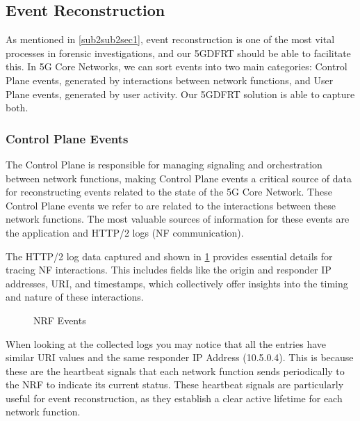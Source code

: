\documentclass[final,1p,times,authoryear]{elsarticle}
\begin{document}
\subsection{Event Reconstruction}
\label{sub4sec2}
As mentioned in \ref{sub2sub2sec1}, event reconstruction is one of the most vital processes in forensic investigations, and our 5GDFRT should be able to facilitate this. In 5G Core Networks, we can sort events into two main categories: Control Plane events, generated by interactions between network functions, and User Plane events, generated by user activity. Our 5GDFRT solution is able to capture both.

\subsubsection{Control Plane Events}
\label{sub4sub2sec1}
The Control Plane is responsible for managing signaling and orchestration between network functions, making Control Plane events a critical source of data for reconstructing events related to the state of the 5G Core Network. These Control Plane events we refer to are related to the interactions between these network functions. The most valuable sources of information for these events are the application and HTTP/2 logs (NF communication).

\vspace{1em}

The HTTP/2 log data captured and shown in \ref{fig:nrf-events} provides essential details for tracing NF interactions. This includes fields like the origin and responder IP addresses, URI, and timestamps, which collectively offer insights into the timing and nature of these interactions.

\begin{figure}[H]
  \centering
  \caption{NRF Events}
  \label{fig:nrf-events}
\end{figure}

When looking at the collected logs you may notice that all the entries have similar URI values and the same responder IP Address (10.5.0.4). This is because these are the heartbeat signals that each network function sends periodically to the NRF to indicate its current status. These heartbeat signals are particularly useful for event reconstruction, as they establish a clear active lifetime for each network function.
\end{document}
